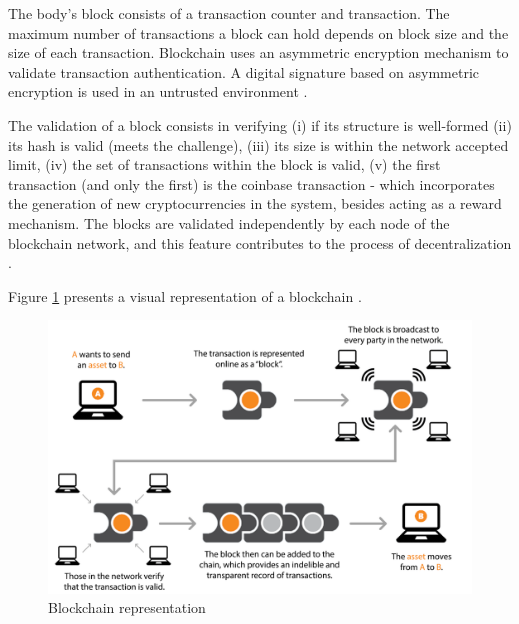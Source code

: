 The body's block consists of a transaction counter and transaction. The maximum number of transactions a block can hold depends on block size and the size of each transaction. Blockchain uses an asymmetric encryption mechanism to validate transaction authentication. A digital signature based on asymmetric encryption is used in an untrusted environment \cite{zheng2016blockchain}.

The validation of a block consists in verifying (i) if its structure is well-formed (ii) its hash is valid (meets the challenge), (iii) its size is within the network accepted limit, (iv) the set of transactions within the block is valid, (v) the first transaction (and only the first) is the coinbase transaction - which incorporates the generation of new cryptocurrencies in the system, besides acting as a reward mechanism. The blocks are validated independently by each node of the blockchain network, and this feature contributes to the process of decentralization \cite{greve2018blockchain}.

Figure \ref{fig:blockchain} presents a visual representation of a blockchain \cite{tian2017supply}.

\begin{figure}[htbp]
\begin{center}
  \includegraphics[scale=0.35]{images/blockchain.png}
\caption{Blockchain representation \cite{michael2018blockchain}}
\label{fig:blockchain}
\end{center}
\end{figure}
